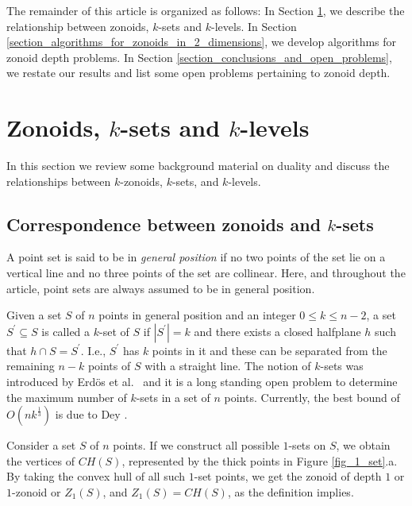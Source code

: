 \documentclass{elsart}
\begin{document}
The remainder of this article is organized as follows: In Section
\ref{section_zonoids_ksets_and_klevels}, we describe the relationship
between zonoids, $k$-sets and $k$-levels.  In Section
\ref{section_algorithms_for_zonoids_in_2_dimensions}, we develop
algorithms for zonoid depth problems.  In Section
\ref{section_conclusions_and_open_problems}, we restate our results
and list some open problems pertaining to zonoid depth.


\section{Zonoids, $k$-sets and $k$-levels}
\label{section_zonoids_ksets_and_klevels}

In this section we review some background material on duality and
discuss the relationships between $k$-zonoids, $k$-sets, and
$k$-levels.

\subsection{Correspondence between zonoids and $k$-sets}\label{subsection_correspondence_between_zonoids_and_ksets}

A point set is said to be in \emph{general position} if no two points
of the set lie on a vertical line and no three points of the set are
collinear. Here, and throughout the article, point sets are always
assumed to be in general position.

Given a set $S$ of $n$ points in general position and an integer $0
\le k \le n-2$, a set $S^{\prime} \subseteq S$ is called a $k$-set of
$S$ if $|S^{\prime}|=k$ and there exists a closed halfplane
$h$ such that $h\cap S=S^{\prime}$. I.e., $S^{\prime}$ has $k$ points
in it and these can be separated from the remaining $n-k$ points of
$S$ with a straight line. The notion of $k$-sets was introduced by
Erd\"{o}s et al.\ \cite{dissection_graphs_of_planar_point_sets} and it
is a long standing open problem to determine the maximum number of
$k$-sets in a set of $n$ points. Currently, the best bound of
$O(nk^{\frac{1}{3}})$ is due to Dey
\cite{improved_bounds_on_planar_ksets_and_klevels}.

Consider a set $S$ of $n$ points. If we construct all possible
$1$-sets on $S$, we obtain the vertices of $CH(S)$, represented by the
thick points in Figure \ref{fig_1_set}.a. By taking the convex hull of
all such $1$-set points, we get the zonoid of depth $1$ or $1$-zonoid
or $Z_1(S)$, and $Z_1(S) = CH(S)$, as the definition implies.
\end{document}
